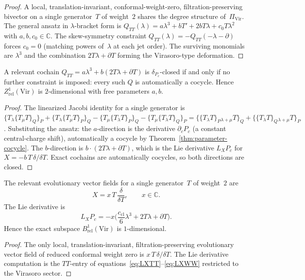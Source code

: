\begin{proof}
A local, translation-invariant, conformal-weight-zero, filtration-preserving
bivector on a single generator~$T$ of weight~$2$ shares the degree
structure of~$\Pi_{\mathrm{Vir}}$. The general ansatz in
$\lambda$-bracket form is
$Q_{TT}(\lambda) = a\lambda^3 + bT' + 2bT\lambda + c_0 T\lambda^2$
with $a,b,c_0\in\mathbb C$. The skew-symmetry constraint
$Q_{TT}(\lambda) = -Q_{TT}(-\lambda-\partial)$ forces $c_0=0$ (matching
powers of~$\lambda$ at each jet order). The surviving monomials are
$\lambda^3$ and the combination $2T\lambda+\partial T$ forming the
Virasoro-type deformation.
\end{proof}

\begin{proposition}
\label{prop:virasoro-cocycles}
A relevant cochain $Q_{TT}=a\lambda^3+b(2T\lambda+\partial T)$ is
$\delta_{P_c}$-closed if and only if no further constraint is imposed:
every such $Q$ is automatically a cocycle. Hence
$Z^1_{\mathrm{rel}}(\mathrm{Vir})$ is $2$-dimensional with free parameters
$a,b$.
\end{proposition}

\begin{proof}
The linearized Jacobi identity for a single generator is
$\{T_\lambda\{T_\mu T\}_Q\}_P
 + \{T_\lambda\{T_\mu T\}_P\}_Q
 - \{T_\mu\{T_\lambda T\}_P\}_Q
 - \{T_\mu\{T_\lambda T\}_Q\}_P
 = \{\{T_\lambda T\}_P{}_{\lambda+\mu}T\}_Q
 + \{\{T_\lambda T\}_Q{}_{\lambda+\mu}T\}_P$.
Substituting the ansatz: the $a$-direction is the derivative
$\partial_c P_c$ (a constant central-charge shift), automatically a cocycle
by Theorem~\ref{thm:parameter-cocycle}. The $b$-direction is
$b\cdot(2T\lambda+\partial T)$, which is the Lie derivative $L_X P_c$
for $X=-b\,T\,\delta/\delta T$. Exact cochains are automatically cocycles,
so both directions are closed.
\end{proof}

\begin{proposition}
\label{prop:virasoro-exacts}
The relevant evolutionary vector fields for a single generator~$T$ of
weight~$2$ are
\[
X = x\,T\,\frac{\delta}{\delta T}, \qquad x\in\mathbb C.
\]
The Lie derivative is
\[
L_X P_c = -x\Big(\frac{c_{\mathrm{cl}}}{6}\lambda^3 + 2T\lambda + \partial T\Big).
\]
Hence the exact subspace $B^1_{\mathrm{rel}}(\mathrm{Vir})$ is
$1$-dimensional.
\end{proposition}

\begin{proof}
The only local, translation-invariant, filtration-preserving evolutionary
vector field of reduced conformal weight zero is $x\,T\,\delta/\delta T$.
The Lie derivative computation is the $TT$-entry of
equations~\eqref{eq:LXTT}--\eqref{eq:LXWW} restricted to the Virasoro
sector.
\end{proof}

